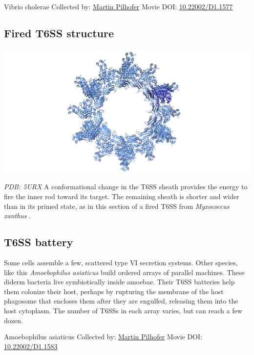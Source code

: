 \documentclass[]{tufte-book}
\begin{document}
\hypertarget{htmlwidget-a664b6c5e1f81d78e366}{}

\label{fig:9-7}Vibrio cholerae Collected by: \protect\hyperlink{martin_pilhofer}{Martin Pilhofer} Movie DOI: \href{https://doi.org/10.22002/D1.1577}{10.22002/D1.1577}

\hypertarget{Fired_T6SS_structure}{%
\subsection{Fired T6SS structure}\label{Fired_T6SS_structure}}

\includegraphics{img/schematics/9_7_1}

\emph{PDB: 5URX}
A conformational change in the T6SS sheath provides the energy to fire the inner rod toward its target. The remaining sheath is shorter and wider than in its primed state, as in this section of a fired T6SS from \emph{Myxococcus xanthus} \citep{chang2017}.

\hypertarget{T6SS_battery}{%
\subsection{T6SS battery}\label{T6SS_battery}}

Some cells assemble a few, scattered type VI secretion systems. Other species, like this \emph{Amoebophilus asiaticus} build ordered arrays of parallel machines. These diderm bacteria live symbiotically inside amoebae. Their T6SS batteries help them colonize their host, perhaps by rupturing the membrane of the host phagosome that encloses them after they are engulfed, releasing them into the host cytoplasm. The number of T6SSs in each array varies, but can reach a few dozen.



\hypertarget{htmlwidget-c23a09e636b28fc93992}{}

\label{fig:9-7a}Amoebophilus asiaticus Collected by: \protect\hyperlink{martin_pilhofer}{Martin Pilhofer} Movie DOI: \href{https://doi.org/10.22002/D1.1583}{10.22002/D1.1583}
\end{document}
